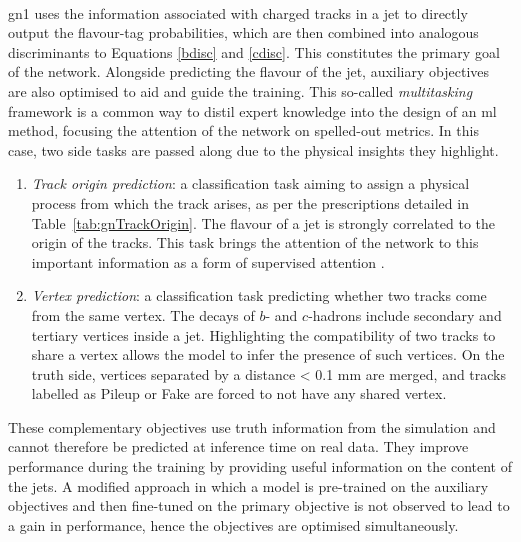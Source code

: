 \paragraph{}\gls{gn1} uses the information associated with charged tracks in a jet to directly output the flavour-tag probabilities, which are then combined into analogous discriminants to Equations \ref{bdisc} and \ref{cdisc}. This constitutes the primary goal of the network. Alongside predicting the flavour of the jet, auxiliary objectives are also optimised to aid and guide the training. This so-called \textit{multitasking} framework is a common way to distil expert knowledge into the design of an \gls{ml} method, focusing the attention of the network on spelled-out metrics. In this case, two side tasks are passed along due to the physical insights they highlight.
\begin{enumerate}
\item \textit{Track origin prediction}: a classification task aiming to assign a physical process from which the track arises, as per the prescriptions detailed in Table~\ref{tab:gnTrackOrigin}. The flavour of a jet is strongly correlated to the origin of the tracks. This task brings the attention of the network to this important information as a form of supervised attention \cite{hwang2021selfsupervised}.
\item \textit{Vertex prediction}: a classification task predicting whether two tracks come from the same vertex. The decays of $b$- and $c$-hadrons include secondary and tertiary vertices inside a jet. Highlighting the compatibility of two tracks to share a vertex allows the model to infer the presence of such vertices. On the truth side, vertices separated by a distance < 0.1 mm are merged, and tracks labelled as Pileup or Fake are forced to not have any shared vertex.
\end{enumerate}
These complementary objectives use truth information from the simulation and cannot therefore be predicted at inference time on real data. They improve performance during the training by providing useful information on the content of the jets. A modified approach in which a model is pre-trained on the auxiliary objectives and then fine-tuned on the primary objective is not observed to lead to a gain in performance, hence the objectives are optimised simultaneously. \\

